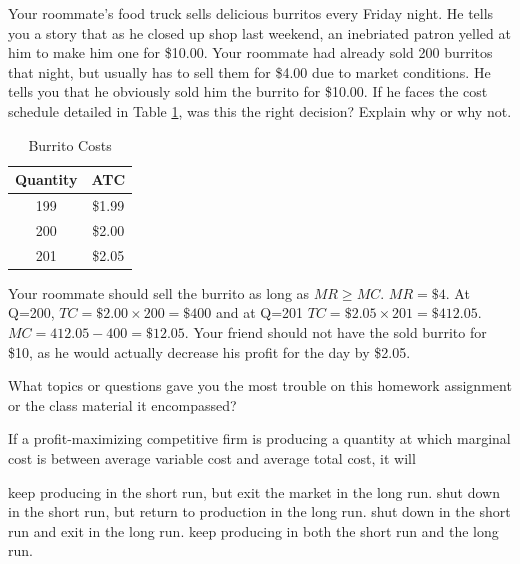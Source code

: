 \documentclass[addpoints,11pt]{exam}
\theoremstyle{definition}
\begin{document}
		\begin{questions}
			
			
			
			
			
			
			
			
			\question[4] Your roommate's food truck sells delicious burritos every Friday night. He tells you a story that as he closed up shop last weekend, an inebriated patron yelled at him to make him one for \$10.00. Your roommate had already sold 200 burritos that night, but usually has to sell them for \$4.00 due to market conditions. He tells you that he obviously sold him the burrito for \$10.00. If he faces the cost schedule detailed in Table \ref{tab5}, was this the right decision? Explain why or why not. 
			
			
			\begin{table}[H]
				\caption{Burrito Costs}
				\centering
				\begin{tabular}{ c|c}        
					
					Quantity  & ATC \\
					\hline
					199 & \$1.99 \\
					200 & \$2.00 \\
					201 & \$2.05 \\
				\end{tabular}
				\label{tab5}
			\end{table}
			
			\begin{solution}
				Your roommate should sell the burrito as long as $MR \ge MC$. $MR = \$4.$ At Q=200, $TC = \$2.00 \times 200 = \$400$ and at Q=201 $TC = \$2.05 \times 201 = \$412.05.$ $MC = 412.05 - 400 = \$12.05$. Your friend should not have the sold burrito for \$10, as he would actually decrease his profit for the day by \$2.05.
			\end{solution}
			
			
			\question What topics or questions gave you the most trouble on this homework assignment or the class material it encompassed? 
			
			
			\question If a profit-maximizing competitive firm is producing a quantity at which marginal cost is between average variable cost and average total cost, it will
			
			\begin{choices}
				\CorrectChoice keep producing in the short run, but exit the market in the long run.
				\choice shut down in the short run, but return to production in the long run. 
				\choice shut down in the short run and exit in the long run.
				\choice keep producing in both the short run and the long run.
			\end{choices}
			

\end{questions}
\end{document}
